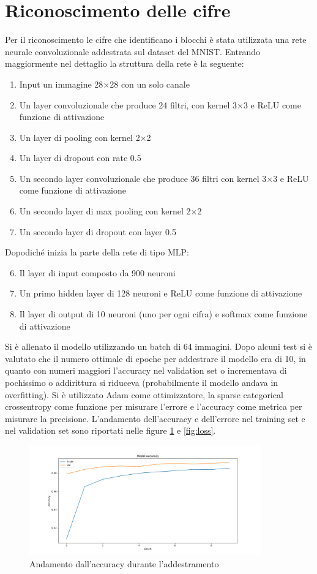\documentclass{article}
\begin{document}
	\section{Riconoscimento delle cifre}
	Per il riconoscimento le cifre che identificano i blocchi è stata utilizzata una rete neurale convoluzionale addestrata sul dataset del MNIST. Entrando maggiormente nel dettaglio la struttura della rete è la seguente:
	\begin{enumerate}
		\item Input un immagine 28$\times$28 con un solo canale
		\item Un layer convoluzionale che produce 24 filtri, con kernel 3$\times$3 e ReLU come funzione di attivazione
		\item Un layer di pooling con kernel 2$\times$2
		\item Un layer di dropout con rate 0.5
		\item Un secondo layer convoluzionale che produce 36 filtri con kernel 3$\times$3 e ReLU come funzione di attivazione
		\item Un secondo layer di max pooling con kernel 2$\times$2
		\item Un secondo layer di dropout con layer 0.5
	\end{enumerate}
	Dopodiché inizia la parte della rete di tipo MLP:
	\begin{enumerate}
		\setcounter{enumi}{5}
		\item Il layer di input composto da 900 neuroni
		\item Un primo hidden layer di 128 neuroni e ReLU come funzione di attivazione
		\item Il layer di output di 10 neuroni (uno per ogni cifra) e softmax come funzione di attivazione
	\end{enumerate}
	Si è allenato il modello utilizzando un batch di 64 immagini. Dopo alcuni test si è valutato che il numero ottimale di epoche per addestrare il modello era di 10, in quanto con numeri maggiori l'accuracy nel validation set o incrementava di pochissimo o addirittura si riduceva (probabilmente il modello andava in overfitting). Si è utilizzato Adam come ottimizzatore, la sparse categorical crossentropy come funzione per misurare l'errore e l'accuracy come metrica per misurare la precisione. L'andamento dell'accuracy e dell'errore nel training set e nel validation set sono riportati nelle figure \ref{fig:accuracy} e \ref{fig:loss}.
	\begin{figure}[H]
		\centering
		\includegraphics[width=10cm]{./images/accuracy.png}
		\caption{Andamento dall'accuracy durante l'addestramento}
		\label{fig:accuracy}
	\end{figure}
\end{document}
